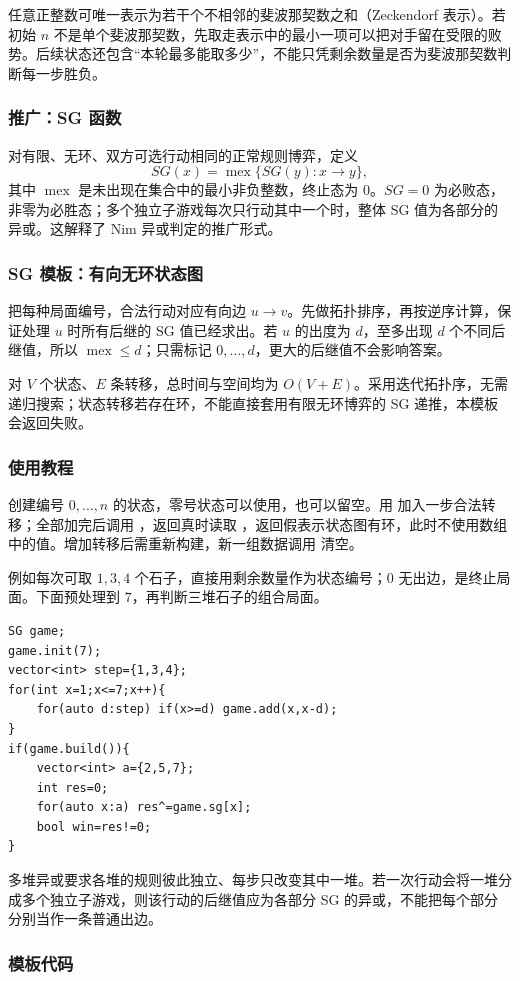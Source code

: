 任意正整数可唯一表示为若干个不相邻的斐波那契数之和（Zeckendorf 表示）。若初始 $n$ 不是单个斐波那契数，先取走表示中的最小一项可以把对手留在受限的败势。后续状态还包含“本轮最多能取多少”，不能只凭剩余数量是否为斐波那契数判断每一步胜负。

\subsubsection*{推广：SG 函数}
对有限、无环、双方可选行动相同的正常规则博弈，定义
\[
    SG(x)=\operatorname{mex}\{SG(y):x\to y\},
\]
其中 $\operatorname{mex}$ 是未出现在集合中的最小非负整数，终止态为 $0$。$SG=0$ 为必败态，非零为必胜态；多个独立子游戏每次只行动其中一个时，整体 SG 值为各部分的异或。这解释了 Nim 异或判定的推广形式。

\subsubsection*{SG 模板：有向无环状态图}
把每种局面编号，合法行动对应有向边 $u\to v$。先做拓扑排序，再按逆序计算，保证处理 $u$ 时所有后继的 SG 值已经求出。若 $u$ 的出度为 $d$，至多出现 $d$ 个不同后继值，所以 $\operatorname{mex}\leq d$；只需标记 $0,\ldots,d$，更大的后继值不会影响答案。

对 $V$ 个状态、$E$ 条转移，总时间与空间均为 $O(V+E)$。采用迭代拓扑序，无需递归搜索；状态转移若存在环，不能直接套用有限无环博弈的 SG 递推，本模板会返回失败。

\subsubsection*{使用教程}
 创建编号 $0,\ldots,n$ 的状态，零号状态可以使用，也可以留空。用  加入一步合法转移；全部加完后调用 ，返回真时读取 ，返回假表示状态图有环，此时不使用数组中的值。增加转移后需重新构建，新一组数据调用  清空。

例如每次可取 $1,3,4$ 个石子，直接用剩余数量作为状态编号；$0$ 无出边，是终止局面。下面预处理到 $7$，再判断三堆石子的组合局面。
\begin{lstlisting}[style=mtycpp,numbers=none]
SG game;
game.init(7);
vector<int> step={1,3,4};
for(int x=1;x<=7;x++){
	for(auto d:step) if(x>=d) game.add(x,x-d);
}
if(game.build()){
	vector<int> a={2,5,7};
	int res=0;
	for(auto x:a) res^=game.sg[x];
	bool win=res!=0;
}
\end{lstlisting}
多堆异或要求各堆的规则彼此独立、每步只改变其中一堆。若一次行动会将一堆分成多个独立子游戏，则该行动的后继值应为各部分 SG 的异或，不能把每个部分分别当作一条普通出边。

\subsubsection*{模板代码}
